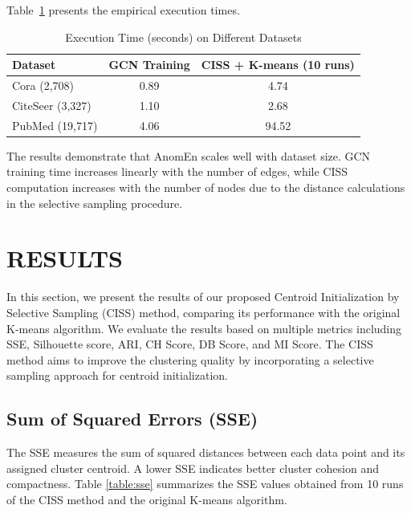 \documentclass[10pt,twocolumn,a4paper]{article}
\begin{document}
Table~\ref{tab:complexity} presents the empirical execution times.

\begin{table}[ht]
\centering
\caption{Execution Time (seconds) on Different Datasets}
\label{tab:complexity}
\begin{tabular}{|l|c|c|}
\hline
\textbf{Dataset} & \textbf{GCN Training} & \textbf{CISS + K-means (10 runs)} \\
\hline
Cora (2,708) & 0.89 & 4.74 \\
\hline
CiteSeer (3,327) & 1.10 & 2.68 \\
\hline
PubMed (19,717) & 4.06 & 94.52 \\
\hline
\end{tabular}
\end{table}

The results demonstrate that AnomEn scales well with dataset size. GCN training time increases linearly with the number of edges, while CISS computation increases with the number of nodes due to the distance calculations in the selective sampling procedure.


\section{RESULTS}

In this section, we present the results of our proposed Centroid Initialization by Selective Sampling (CISS) method, comparing its performance with the original K-means algorithm. We evaluate the results based on multiple metrics including SSE, Silhouette score, ARI, CH Score, DB Score, and MI Score. The CISS method aims to improve the clustering quality by incorporating a selective sampling approach for centroid initialization.

\subsection{Sum of Squared Errors (SSE)}

The SSE measures the sum of squared distances between each data point and its assigned cluster centroid. A lower SSE indicates better cluster cohesion and compactness. Table \ref{table:sse} summarizes the SSE values obtained from 10 runs of the CISS method and the original K-means algorithm.
\end{document}
